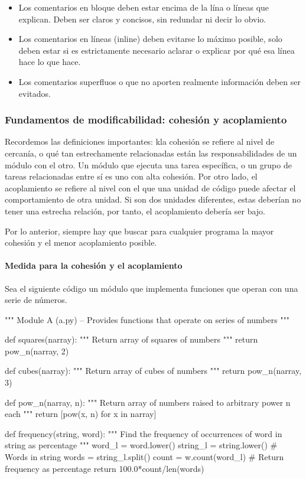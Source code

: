 \begin{itemize}
    \item Los comentarios en bloque deben estar encima de la lína o líneas que explican. Deben ser claros y concisos, sin redundar ni decir lo obvio.
    \item Los comentarios en líneas (inline) deben evitarse lo máximo posible, solo deben estar si es estrictamente necesario aclarar o explicar por qué esa línea hace lo que hace.
    \item Los comentarios superfluos o que no aporten realmente información deben ser evitados. 
\end{itemize}

\subsubsection{Fundamentos de modificabilidad: cohesión y acoplamiento}

Recordemos las definiciones importantes: kla cohesión se refiere al nivel de cercanía, o qué tan estrechamente relacionadas están las responsabilidades de un módulo con el otro. Un módulo que ejecuta una tarea específica, o un grupo de tareas relacionadas entre sí es uno con alta cohesión. Por otro lado, el acoplamiento se refiere al nivel con el que una unidad de código puede afectar el comportamiento de otra unidad. Si son dos unidades diferentes, estas deberían no tener una estrecha relación, por tanto, el acoplamiento debería ser bajo. 

Por lo anterior, siempre hay que buscar para cualquier programa la mayor cohesión y el menor acoplamiento posible.

\paragraph{Medida para la cohesión y el acoplamiento}

Sea el siguiente código un módulo que implementa funciones que operan con una serie de números.

\begin{VerbatimBold}
""" Module A (a.py) – Provides functions that operate on series of
numbers """

def squares(narray):
    """ Return array of squares of numbers """
    return pow_n(narray, 2)

def cubes(narray):
    """ Return array of cubes of numbers """
    return pow_n(narray, 3)

def pow_n(narray, n):
    """ Return array of numbers raised to arbitrary power n each """
    return [pow(x, n) for x in narray]

def frequency(string, word):
    """ Find the frequency of occurrences of word in string
    as percentage """
    word_l = word.lower()
    string_l = string.lower()
    # Words in string
    words = string_l.split()
    count = w.count(word_l)
    # Return frequency as percentage
    return 100.0*count/len(words)
\end{VerbatimBold}

